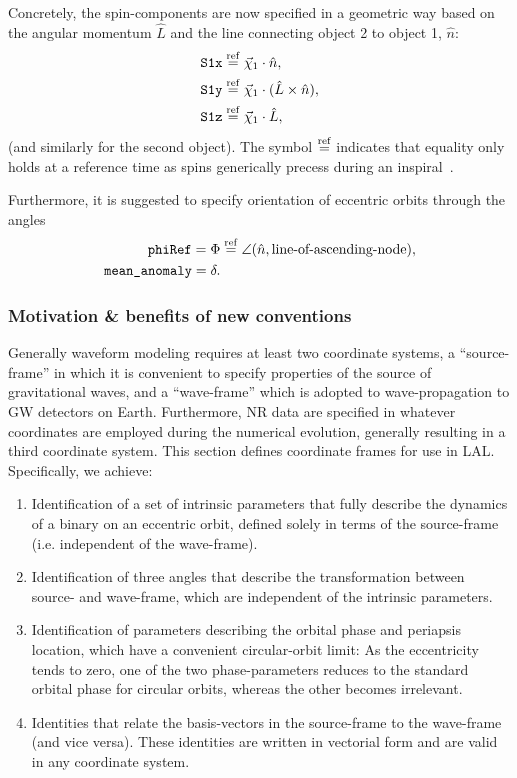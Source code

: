 \documentclass[11pt,tightenlines,article,amssymb,amsmath,amsfonts,superscriptaddress,nofootinbib]{revtex4}
\newcommand{\nNR}{\hat{n}}
\newcommand{\lNR}{\hat L}
\newcommand{\phiRef}{\Phi} %
\newcommand{\equalref}{\overset{\rm ref}{=}}
\begin{document}
Concretely, the spin-components are now specified in a geometric
way based on the angular momentum $\lNR$ and the line connecting object 2 to
object 1, $\nNR$:
\begin{align}
  \mbox{\tt S1x}&\equalref \vec\chi_1\cdot\nNR,\\
  \mbox{\tt S1y}&\equalref \vec\chi_1\cdot (\lNR\times\nNR),\\
  \mbox{\tt S1z}&\equalref \vec\chi_1\cdot\lNR,
\end{align}
(and similarly for the second object). The symbol $\equalref$ indicates
that equality only holds at a reference time as spins generically
precess during an inspiral~\cite{Apostolatos:1994mx, Kidder:1995zr}.

Furthermore, it is suggested to specify
orientation of eccentric orbits through the angles
\begin{align}
  \mbox{\tt phiRef} = \phiRef &\equalref \angle(\nNR, \mbox{line-of-ascending-node}),\\
  \mbox{\tt mean\_anomaly}= \delta.& %
  \end{align}

\subsubsection{Motivation \& benefits of new conventions}
Generally waveform modeling requires at least two coordinate
systems, a ``source-frame'' in which it is convenient to specify
properties of the source of gravitational waves, and a ``wave-frame''
which is adopted to wave-propagation to GW detectors on Earth.
Furthermore, NR data are specified in whatever
coordinates are employed during the numerical evolution, generally
resulting in a third coordinate system. This section defines coordinate frames 
for use in LAL. Specifically, we
achieve:
\begin{enumerate}
  \item Identification of a set of intrinsic parameters that fully
    describe the dynamics of a binary on an eccentric orbit,
    defined solely in terms of the source-frame (i.e. independent of
    the wave-frame).
  \item Identification of three angles that describe the
    transformation between source- and wave-frame, which are
    independent of the intrinsic parameters.
  \item Identification of parameters describing the orbital phase and
    periapsis location, which have a convenient circular-orbit limit:
    As the eccentricity tends to zero, one of the two phase-parameters
    reduces to the standard orbital phase for circular orbits, whereas
    the other becomes irrelevant.
  \item Identities that relate the basis-vectors in the source-frame to the
    wave-frame (and vice versa).  These identities are written in
    vectorial form and are valid in any coordinate system.
\end{enumerate}
\end{document}
